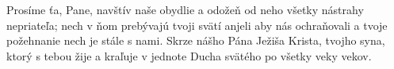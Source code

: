 Prosíme ťa, Pane, navštív naše obydlie a odožeň od neho všetky nástrahy nepriateľa; nech v ňom prebývajú tvoji svätí anjeli aby nás ochraňovali a tvoje požehnanie nech je stále s nami. Skrze nášho Pána Ježiša Krista, tvojho syna, ktorý s tebou žije a kraľuje v jednote Ducha svätého po všetky veky vekov.

